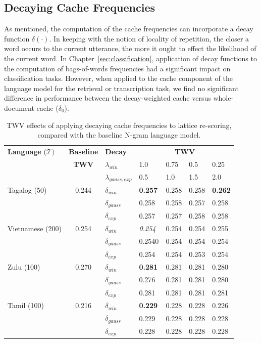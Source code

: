 \subsection{Decaying Cache Frequencies}
As mentioned, the computation of the cache frequencies can incorporate a decay function $\delta(\cdot)$.  In keeping with the notion of locality of repetition, the closer a word occurs to the current utterance, the more it ought to effect the likelihood of the current word.   In Chapter~\ref{sec:classification}, application of decay functions to the computation of bags-of-words frequencies had a significant impact on classification tasks.  However, when applied to the cache component of the language model for the retrieval or transcription task, we find no significant difference in performance between the decay-weighted cache versus whole-document cache ($\delta_0$).   

 
\begin{table}
\centering
\begin{tabular}{lclllll} \toprule
   \textbf{Language} ($\mathcal{T})$ & \textbf{Baseline} & \textbf{Decay} & \multicolumn{4}{c}{\textbf{TWV}}  \\ %
   & \textbf{TWV} & $\lambda_{win}$ & 1.0\footnotemark & 0.75 & 0.5 & 0.25 \\
   & & $\lambda_{gauss,exp}$ & 0.5 & 1.0 & 1.5 & 2.0 \\ \midrule
Tagalog (50) & 0.244 & $\delta_{win}$ & \textbf{0.257}  & 0.258 & 0.258 & \textbf{0.262} \\
  & & $\delta_{gauss}$ & 0.258 & 0.258 & 0.257 & 0.258 \\
  & & $\delta_{exp}$ & 0.257 & 0.257 & 0.258 & 0.258 \\  
Vietnamese (200) & 0.254 & $\delta_{win}$ & \textit{0.254} & 0.254 & 0.254 & 0.255  \\
& & $\delta_{gauss}$ & 0.2540 & 0.254 & 0.254 & 0.254 \\
&& $\delta_{exp}$ & 0.254 & 0.254 & 0.253 & 0.254 \\
Zulu (100) &  0.270 & $\delta_{win}$ & \textbf{0.281} & 0.281  & 0.281 & 0.280 \\
& & $\delta_{gauss}$ & 0.276 & 0.281 & 0.281 & 0.280 \\
& & $\delta_{exp}$ & 0.281 & 0.281 & 0.281 & 0.281 \\
Tamil (100) & 0.216 & $\delta_{win}$ & \textbf{0.229} & 0.228 & 0.228 & 0.226 \\
& & $\delta_{gauss}$ & 0.229 & 0.228 & 0.228 & 0.228 \\
& & $\delta_{exp}$ & 0.228 & 0.228 & 0.228 & 0.228 \\
        \bottomrule
\end{tabular}
\caption[TWV effects of decaying cache frequencies]{TWV effects of applying decaying cache frequencies to lattice re-scoring, compared with the baseline N-gram language model. \label{fig7:decay}}
\end{table}


